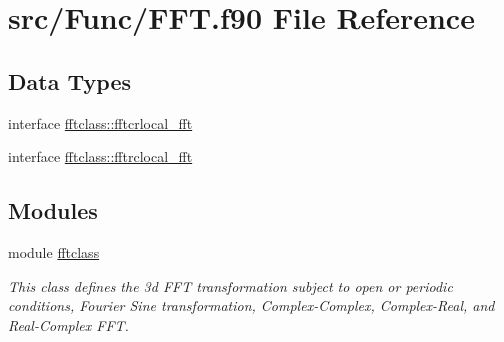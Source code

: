 \hypertarget{_f_f_t_8f90}{}\section{src/\+Func/\+F\+FT.f90 File Reference}
\label{_f_f_t_8f90}
\subsection*{Data Types}
\begin{DoxyCompactItemize}
\item 
interface \mbox{\hyperlink{interfacefftclass_1_1fftcrlocal__fft}{fftclass\+::fftcrlocal\+\_\+fft}}
\item 
interface \mbox{\hyperlink{interfacefftclass_1_1fftrclocal__fft}{fftclass\+::fftrclocal\+\_\+fft}}
\end{DoxyCompactItemize}
\subsection*{Modules}
\begin{DoxyCompactItemize}
\item 
module \mbox{\hyperlink{namespacefftclass}{fftclass}}
\begin{DoxyCompactList}\small\item\em This class defines the 3d F\+FT transformation subject to open or periodic conditions, Fourier Sine transformation, Complex-\/\+Complex, Complex-\/\+Real, and Real-\/\+Complex F\+FT. \end{DoxyCompactList}\end{DoxyCompactItemize}
